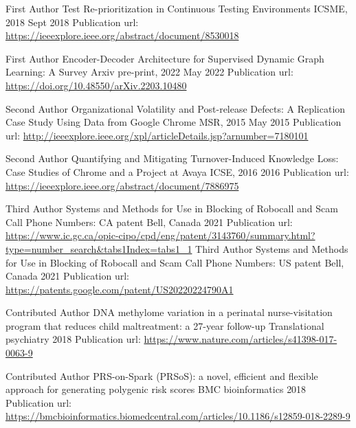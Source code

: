 \documentclass[11pt, a4paper]{awesome-cv} %
\begin{document}
\begin{cventries}
	
	\cventry
	{First Author} %
	{Test Re-prioritization in Continuous Testing Environments} %
	{ICSME, 2018} %
	{Sept 2018} %
	{Publication url: \url{https://ieeexplore.ieee.org/abstract/document/8530018}
	}
	
	
	\cventry
	{First Author} %
	{Encoder-Decoder Architecture for Supervised Dynamic Graph Learning: A Survey} %
	{Arxiv pre-print, 2022} %
	{May 2022} %
	{Publication url: \url{https://doi.org/10.48550/arXiv.2203.10480}
	}
	
	
	\cventry
	{Second Author} %
	{Organizational Volatility and Post-release Defects: A Replication Case Study Using Data from Google Chrome} %
	{MSR, 2015 } %
	{May 2015} %
    {Publication url: \url{http://ieeexplore.ieee.org/xpl/articleDetails.jsp?arnumber=7180101}
    }
	
	
	
	\cventry
	{Second Author} %
	{Quantifying and Mitigating Turnover-Induced Knowledge Loss: Case Studies of Chrome and a Project at Avaya} %
	{ICSE, 2016} %
	{2016} %
    {Publication url: \url{https://ieeexplore.ieee.org/abstract/document/7886975}
}


	
	
\cventry
{Third Author} %
{Systems and Methods for Use in Blocking of Robocall and Scam Call Phone Numbers: CA patent} %
{Bell, Canada} %
{2021} %
{Publication url: \url{https://www.ic.gc.ca/opic-cipo/cpd/eng/patent/3143760/summary.html?type=number_search&tabs1Index=tabs1_1}
}
\cventry
{Third Author} %
{Systems and Methods for Use in Blocking of Robocall and Scam Call Phone Numbers: US patent} %
{Bell, Canada} %
{2021} %
{Publication url: 
	\url{https://patents.google.com/patent/US20220224790A1}
}
	
		\cventry
	{Contributed Author} %
	{DNA methylome variation in a perinatal nurse-visitation program that reduces child maltreatment: a 27-year follow-up} %
	{Translational psychiatry} %
	{2018} %
    {Publication url: \url{https://www.nature.com/articles/s41398-017-0063-9}
}

	
	
	\cventry
	{Contributed Author} %
	{PRS-on-Spark (PRSoS): a novel, efficient and flexible approach for generating polygenic risk scores} %
	{BMC bioinformatics} %
	{2018} %
	    {Publication url: \url{https://bmcbioinformatics.biomedcentral.com/articles/10.1186/s12859-018-2289-9}
	}
	
	
\end{cventries}
%
\end{document}
